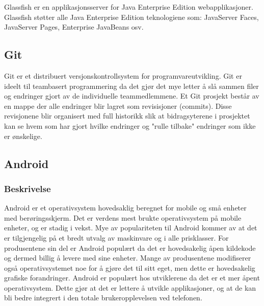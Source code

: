 \documentclass[../main.tex]{subfiles}
\begin{document}
Glassfish er en applikasjonsserver for Java Enterprise Edition webapplikasjoner. Glassfish støtter alle Java Enterprise Edition teknologiene som: JavaServer Faces, JavaServer Pages, Enterprise JavaBeans osv. 

\subsection{Git}

Git er et distribuert versjonskontrollsystem for programvareutvikling.  Git er ideelt til teambasert programmering da det gjør det mye letter å slå sammen filer og endringer gjort av de individuelle teammedlemmene. Et Git prosjekt består av en mappe der alle endringer blir lagret som revisisjoner (commits). Disse revisjonene blir organisert med full historikk slik at bidragsyterene i prosjektet kan se hvem som har gjort hvilke endringer og "rulle tilbake" endringer som ikke er ønskelige.  

\subsection{Android}

\subsubsection{Beskrivelse}

Android er et operativsystem hovedsaklig beregnet for mobile og små enheter med berøringsskjerm. Det er verdens mest brukte operativsystem på mobile enheter, og er stadig i vekst.  Mye av populariteten til Android kommer av at det er tilgjengelig på et bredt utvalg av maskinvare og i alle prisklasser.  For produsentene sin del er Android populært da det er hovedsakelig åpen kildekode  og dermed billig å levere med sine enheter. Mange av produsentene modifiserer også operativsystemet noe for å gjøre det til sitt eget, men dette er hovedsakelig grafiske forandringer.\newline
Android er populært hos utviklerene da det er et mer åpent operativsystem. Dette gjør at det er lettere å utvikle applikasjoner, og at de kan bli bedre integrert i den totale brukeropplevelsen ved telefonen. 
\end{document}
